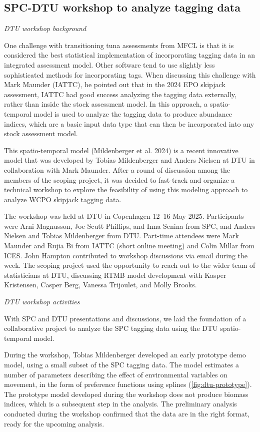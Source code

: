 \documentclass{SCreport}
\begin{document}
\subsection{SPC-DTU workshop to analyze tagging data}
\label{sec:dtu-2025-workshop}

\textit{DTU workshop background}

One challenge with transitioning tuna assessments from MFCL is that it is
considered the best statistical implementation of incorporating tagging data in
an integrated assessment model. Other software tend to use slightly less
sophisticated methods for incorporating tags. When discussing this challenge
with Mark Maunder (IATTC), he pointed out that in the 2024 EPO skipjack
assessment, IATTC had good success analyzing the tagging data externally, rather
than inside the stock assessment model. In this approach, a spatio-temporal
model is used to analyze the tagging data to produce abundance indices, which
are a basic input data type that can then be incorporated into any stock
assessment model.

This spatio-temporal model (Mildenberger et al. 2024) is a recent innovative
model that was developed by Tobias Mildenberger and Anders Nielsen at DTU in
collaboration with Mark Maunder. After a round of discussion among the members
of the scoping project, it was decided to fast-track and organize a technical
workshop to explore the feasibility of using this modeling approach to analyze
WCPO skipjack tagging data.

The workshop was held at DTU in Copenhagen 12--16 May 2025. Participants were
Arni Magnusson, Joe Scutt Phillips, and Inna Senina from SPC, and Anders Nielsen
and Tobias Mildenberger from DTU. Part-time attendees were Mark Maunder and
Rujia Bi from IATTC (short online meeting) and Colin Millar from ICES. John
Hampton contributed to workshop discussions via email during the week. The
scoping project used the opportunity to reach out to the wider team of
statisticians at DTU, discussing RTMB model development with Kasper Kristensen,
Casper Berg, Vanessa Trijoulet, and Molly Brooks.

\vspace{2ex}

\textit{DTU workshop activities}

With SPC and DTU presentations and discussions, we laid the foundation of a
collaborative project to analyze the SPC tagging data using the DTU
spatio-temporal model.

During the workshop, Tobias Mildenberger developed an early prototype demo
model, using a small subset of the SPC tagging data. The model estimates a
number of parameters describing the effect of environmental variables on
movement, in the form of preference functions using splines
(\autoref{fig:dtu-prototype}). The prototype model developed during the workshop
does not produce biomass indices, which is a subsequent step in the analysis.
The preliminary analysis conducted during the workshop confirmed that the data
are in the right format, ready for the upcoming analysis.
\end{document}
